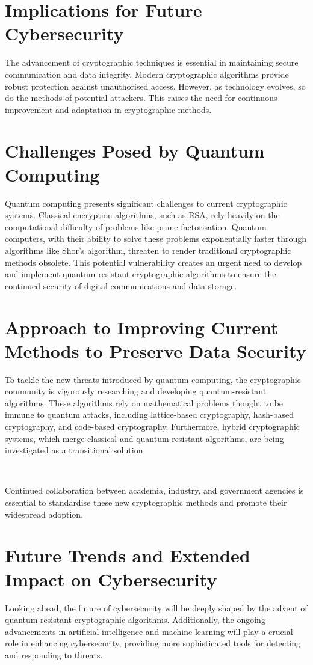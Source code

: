 \documentclass[11pt]{article}
\begin{document}
\section{Implications for Future Cybersecurity}
The advancement of cryptographic techniques is essential in maintaining secure communication and data integrity. Modern cryptographic algorithms provide robust protection against unauthorised access. However, as technology evolves, so do the methods of potential attackers. This raises the need for continuous improvement and adaptation in cryptographic methods.

\section{Challenges Posed by Quantum Computing}
Quantum computing presents significant challenges to current cryptographic systems. Classical encryption algorithms, such as RSA, rely heavily on the computational difficulty of problems like prime factorisation. Quantum computers, with their ability to solve these problems exponentially faster through algorithms like Shor’s algorithm, threaten to render traditional cryptographic methods obsolete. This potential vulnerability creates an urgent need to develop and implement quantum-resistant cryptographic algorithms to ensure the continued security of digital communications and data storage.

\section{Approach to Improving Current Methods to Preserve Data Security}
To tackle the new threats introduced by quantum computing, the cryptographic community is vigorously researching and developing quantum-resistant algorithms. These algorithms rely on mathematical problems thought to be immune to quantum attacks, including lattice-based cryptography, hash-based cryptography, and code-based cryptography. Furthermore, hybrid cryptographic systems, which merge classical and quantum-resistant algorithms, are being investigated as a transitional solution.

\

Continued collaboration between academia, industry, and government agencies is essential to standardise these new cryptographic methods and promote their widespread adoption. 


\section{Future Trends and Extended Impact on Cybersecurity}
Looking ahead, the future of cybersecurity will be deeply shaped by the advent of quantum-resistant cryptographic algorithms. Additionally, the ongoing advancements in artificial intelligence and machine learning will play a crucial role in enhancing cybersecurity, providing more sophisticated tools for detecting and responding to threats.
\end{document}
